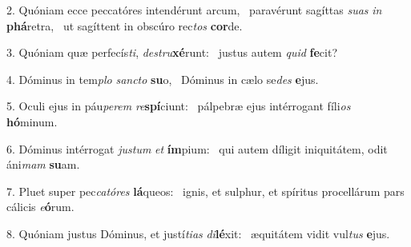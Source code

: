 2. Quóniam ecce peccatóres intendérunt arcum, \dag\  paravérunt sagíttas \textit{su}\textit{as} \textit{in} \textbf{phá}retra, \ast\  ut sagíttent in obscúro rec\textit{tos} \textbf{cor}de.\

3. Quóniam quæ perfecís\textit{ti}, \textit{de}\textit{stru}\textbf{xé}runt: \ast\  justus autem \textit{quid} \textbf{fe}cit?\

4. Dóminus in tem\textit{plo} \textit{sanc}\textit{to} \textbf{su}o, \ast\  Dóminus in cælo se\textit{des} \textbf{e}jus.\

5. Oculi ejus in páu\textit{pe}\textit{rem} \textit{re}\textbf{spí}ciunt: \ast\  pálpebræ ejus intérrogant fíli\textit{os} \textbf{hó}minum.\

6. Dóminus intérrogat \textit{jus}\textit{tum} \textit{et} \textbf{ím}pium: \ast\  qui autem díligit iniquitátem, odit áni\textit{mam} \textbf{su}am.\

7. Pluet super pec\textit{ca}\textit{tó}\textit{res} \textbf{lá}queos: \ast\  ignis, et sulphur, et spíritus procellárum pars cálicis \textit{e}\textbf{ó}rum.\

8. Quóniam justus Dóminus, et justí\textit{ti}\textit{as} \textit{di}\textbf{lé}xit: \ast\  æquitátem vidit vul\textit{tus} \textbf{e}jus.\

